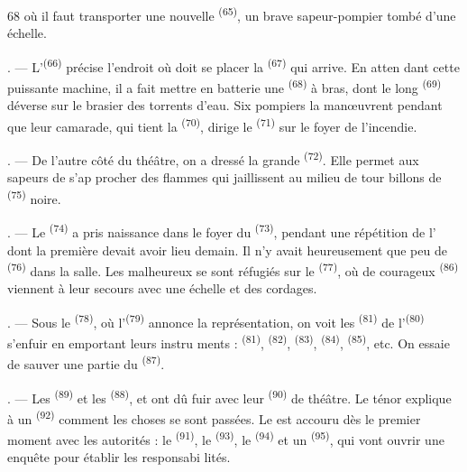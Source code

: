 \begin{VUpage}[70]{68}
\VUcontinue
où il faut transporter une nouvelle \textsuperscript{(65)}, un\nl
brave sapeur-pompier tombé d'une échelle.

. --- L'\textsuperscript{(66)} précise l'endroit où doit se\nl
placer la \textsuperscript{(67)} qui arrive. En atten\cc
dant cette puissante machine, il a fait mettre en\nl
batterie une \textsuperscript{(68)} à bras, dont le long \textsuperscript{(69)}\nl
déverse sur le brasier des torrents d'eau. Six pompiers\nl
la manœuvrent pendant que leur camarade, qui tient\nl
la \textsuperscript{(70)}, dirige le \textsuperscript{(71)} sur le foyer de l'incendie.

. --- De l'autre côté du théâtre, on a dressé la\nl
grande \textsuperscript{(72)}. Elle permet aux sapeurs de s'ap\cc
procher des flammes qui jaillissent au milieu de tour\cc
billons de \textsuperscript{(75)} noire.

. --- Le \textsuperscript{(74)} a pris naissance dans le foyer du\nl
{}\textsuperscript{(73)}, pendant une répétition de l'\nl
dont la première  devait avoir lieu\nl
demain. Il n'y avait heureusement que peu de \cc
{}\textsuperscript{(76)} dans la salle. Les malheureux se sont\nl
réfugiés sur le \textsuperscript{(77)}, où de courageux \cc
{}\textsuperscript{(86)} viennent à leur secours avec une échelle et\nl
des cordages.

. --- Sous le \textsuperscript{(78)}, où l'\textsuperscript{(79)} annonce\nl
la représentation, on voit les \textsuperscript{(81)} de\nl
l'\textsuperscript{(80)} s'enfuir en emportant leurs instru\cc
ments : \textsuperscript{(81)}, \textsuperscript{(82)}, \textsuperscript{(83)}, \cc
{}\textsuperscript{(84)}, \textsuperscript{(85)}, etc. On essaie de sauver une\nl
partie du \textsuperscript{(87)}.

. --- Les \textsuperscript{(89)} et les \textsuperscript{(88)}, \cc
{} et  ont dû fuir avec leur \cc
{}\textsuperscript{(90)} de théâtre. Le ténor explique à un \cc
{}\textsuperscript{(92)} comment les choses se sont passées. Le\nl
{} est accouru dès le premier moment avec\nl
les autorités : le \textsuperscript{(91)}, le \textsuperscript{(93)}, le \cc
{}\textsuperscript{(94)} et un \textsuperscript{(95)}, qui\nl
vont ouvrir une enquête pour établir les responsabi\cc
lités.

\VUsaut{6.0mm}
\VUfilet{22mm}
\end{VUpage}
